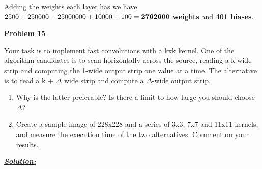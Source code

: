 \documentclass{article}
\begin{document}
\noindent Adding the weights each layer has we have $2500+250000+25000000+10000+100 = \\\bm{2762600}$ \textbf{weights} and \textbf{401 biases}.

\newpage
\noindent \textbf{Problem 15}

Your task is to implement fast convolutions with a kxk kernel. One of the algorithm
candidates is to scan horizontally across the source, reading a k-wide strip and computing
the 1-wide output strip one value at a time. The alternative is to read a k + $\Delta$ wide strip
and compute a $\Delta$-wide output strip.
\begin{enumerate} [label=\Alph*]
    \item Why is the latter preferable? Is there a limit to how large you should choose $\Delta$?
    \item Create a sample image of 228x228 and a series of 3x3, 7x7 and 11x11 kernels, and
measure the execution time of the two alternatives. Comment on your results.

\end{enumerate}
\vspace{1cm}

\noindent \underline{\textbf{\textit{Solution:}}}
\end{document}
